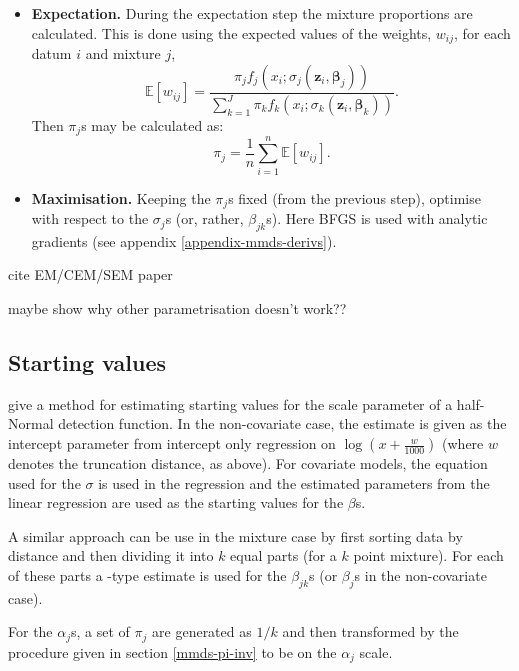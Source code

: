 \begin{itemize}
\item \textbf{Expectation.}
During the expectation step the mixture proportions are calculated. This is done using the expected values of the weights, $w_{ij}$, for each datum $i$ and mixture $j$,
\begin{equation*}
\mathbb{E}[w_{ij}] = \frac{\pi_j f_j(x_i;\sigma_j(\bm{z}_i,\bm{\beta}_j))}{\sum_{k=1}^J \pi_k f_k(x_i;\sigma_k(\bm{z}_i,\bm{\beta}_k))}.
\end{equation*}
Then $\pi_j$s may be calculated as:
\begin{equation*}
\pi_j=\frac{1}{n} \sum_{i=1}^n \mathbb{E}[w_{ij}].
\end{equation*}

\item \textbf{Maximisation.}
Keeping the $\pi_j$s fixed (from the previous step), optimise with respect to the $\sigma_j$s (or, rather, $\beta_{jk}$s). Here BFGS is used with analytic gradients (see appendix \ref{appendix-mmds-derivs}). 
\end{itemize}



cite EM/CEM/SEM paper

maybe show why other parametrisation doesn't work??


\subsection{Starting values}
\label{mmds-starting-vals}
\cite{beavers98} give a method for estimating starting values for the scale parameter of a half-Normal detection function. In the non-covariate case, the estimate is given as the intercept parameter from intercept only regression on $\log(x+\frac{w}{1000})$ (where $w$ denotes the truncation distance, as above). For covariate models, the equation used for the $\sigma$ is used in the regression and the estimated parameters from the linear regression are used as the starting values for the $\beta$s.

A similar approach can be use in the mixture case by first sorting data by distance and then dividing it into $k$ equal parts (for a $k$ point mixture). For each of these parts a \cite{beavers98}-type estimate is used for the $\beta_{jk}$s (or $\beta_j$s in the non-covariate case).

For the $\alpha_j$s, a set of $\pi_j$ are generated as $1/k$ and then transformed by the procedure given in section \ref{mmds-pi-inv} to be on the $\alpha_j$ scale.


